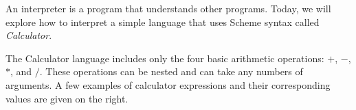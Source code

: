 An interpreter is a program that understands other programs. Today, we will
explore how to interpret a simple language that uses Scheme syntax called
\textit{Calculator}.

The Calculator language includes only the four basic arithmetic operations:
$+$, $-$, $*$, and $/$. These operations can be nested and can take any numbers
of arguments. A few examples of calculator expressions and their corresponding
values are given on the right.
